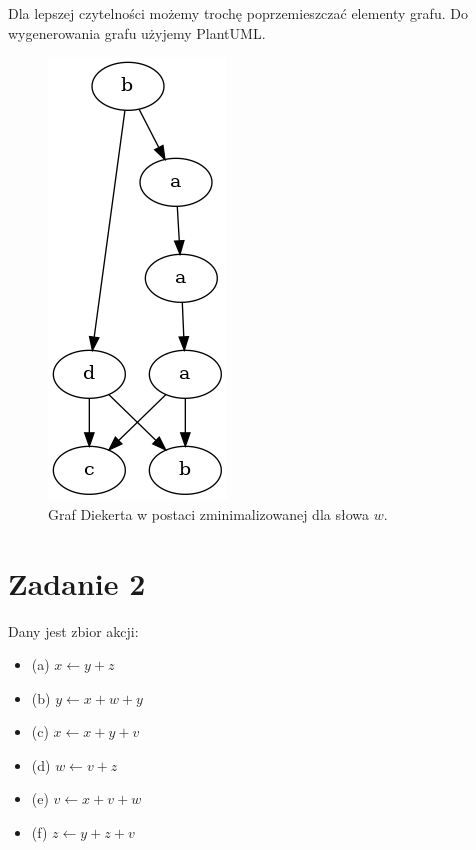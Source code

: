 \documentclass[11pt]{article}
\begin{document}
Dla lepszej czytelności możemy trochę poprzemieszczać elementy grafu. Do wygenerowania grafu użyjemy PlantUML.

\begin{figure}[H]
\centering
\includegraphics[width=0.6\linewidth]{graph1.png}
\caption{\label{}Graf Diekerta w postaci zminimalizowanej dla słowa \(w\).}
\end{figure}
\section*{Zadanie 2}
\label{sec:orgd442adc}
Dany jest zbior akcji:
\begin{itemize}
\item (a) \(x \leftarrow y + z\)
\item (b) \(y \leftarrow x + w +y\)
\item (c) \(x \leftarrow x + y + v\)
\item (d) \(w \leftarrow v + z\)
\item (e) \(v \leftarrow x + v + w\)
\item (f) \(z \leftarrow y + z+ v\)
\end{itemize}
\end{document}

